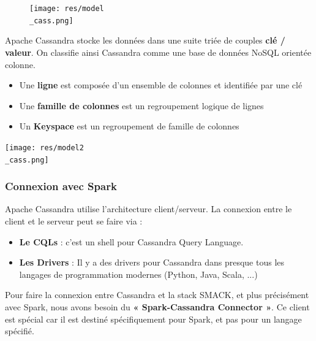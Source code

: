 \documentclass[a4paper, 11pt, titlepage]{article}
\begin{document}
\begin{figure}
\texttt{[image: res/model\\\_cass.png]}
\end{figure}

\noindent Apache Cassandra stocke les données dans une suite triée de couples \textbf{clé / valeur}. On classifie ainsi Cassandra comme une base de données NoSQL orientée colonne.

\begin{itemize}

\item
Une \textbf{ligne} est composée d'un ensemble de colonnes et identifiée par une clé

\item
Une \textbf{famille de colonnes} est un regroupement logique de lignes

\item
Un \textbf{Keyspace} est un regroupement de famille de colonnes

\end{itemize}

\begin{center}
\texttt{[image: res/model2\\\_cass.png]}
\end{center}


\subsubsection* {Connexion avec Spark}

Apache Cassandra utilise l'architecture client/serveur. La connexion entre le client et le serveur peut se faire via :

\begin{itemize}

\item
\textbf{Le CQLs} : c'est un shell pour Cassandra Query Language.

\item
\textbf{Les Drivers} : Il y a des drivers pour Cassandra dans presque tous les langages de programmation modernes (Python, Java, Scala, ...)

\end{itemize}


Pour faire la connexion entre Cassandra et la stack SMACK, et plus précisément avec Spark, nous avons besoin du \textbf{« Spark-Cassandra Connector »}. Ce client est spécial car il est destiné spécifiquement pour Spark, et pas pour un langage spécifié.
\end{document}
